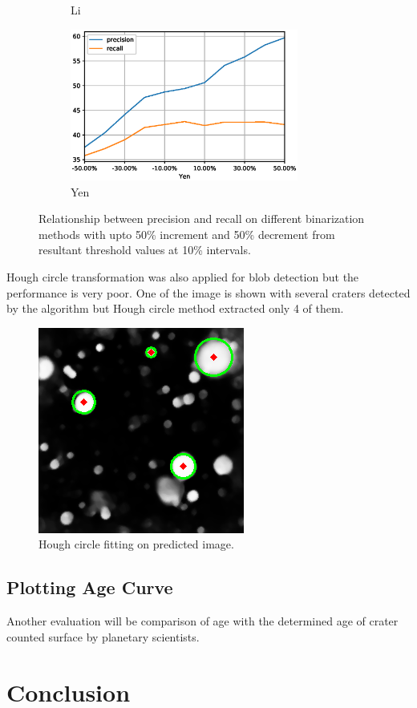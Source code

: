 \documentclass[11pt]{article}
\begin{document}
\begin{figure}[H]
\begin{subfigure}{7cm}
		\caption{Li}
	\end{subfigure}
	\begin{subfigure}[b]{1.0\textwidth}
		\centering
		\includegraphics[width=7.5cm]{files/results/yen.eps}
		\caption{Yen}
	\end{subfigure}

	\caption{Relationship between precision and recall on different binarization methods with upto 50\% increment and 50\% decrement from resultant threshold values at 10\% intervals.}
	\label{thresh_methods}
\end{figure}

Hough circle transformation was also applied for blob detection but the performance is very poor. One of the image is shown with several craters detected by the algorithm but Hough circle method extracted only 4 of them.

\begin{figure}[H]
	\centering
	\includegraphics[width=.4\textwidth]{files/results/hough.png}
	\caption{Hough circle fitting on predicted image.}
	\label{hough}
\end{figure}

\subsection{Plotting Age Curve}
Another evaluation will be comparison of age with the determined age of crater counted surface by planetary scientists.


\section{Conclusion}



\newpage
\clearpage




	


\end{document}
